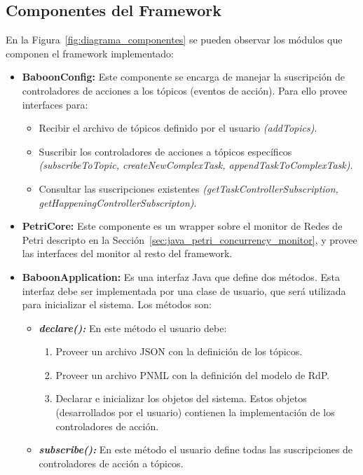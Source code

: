\subsection{Componentes del Framework}
En la Figura~\ref{fig:diagrama_componentes} se pueden observar los
módulos que componen el framework implementado:
\begin{itemize}
  \item \textbf{BaboonConfig: } Este componente se encarga de manejar la
  suscripción de controladores de acciones a los tópicos (eventos de acción).
  Para ello provee interfaces para:
	  \begin{itemize}
	    \item Recibir el archivo de tópicos definido por el usuario
	    \emph{(addTopics)}.
	    \item Suscribir los controladores de acciones a tópicos específicos
	    \emph{(subscribeToTopic, createNewComplexTask, appendTaskToComplexTask)}.
	    \item Consultar las suscripciones existentes
	    \emph{(getTaskControllerSubscription,
	    getHappeningControllerSubscripton)}.
	  \end{itemize}
	  
  \item \textbf{PetriCore: } Este componente es un wrapper sobre el monitor de
  Redes de Petri descripto en la
  Sección~\ref{sec:java_petri_concurrency_monitor}, y provee las interfaces del
  monitor al resto del framework.
  
  \item \textbf{BaboonApplication: } Es una interfaz Java que define dos
  métodos. Esta interfaz debe ser implementada por una clase de usuario, que
  será utilizada para inicializar el sistema. Los métodos son:
  \begin{itemize}
    \item \textbf{\emph{declare(): }} En este método el usuario debe:
    	\begin{enumerate}
    	  \item Proveer un archivo JSON con la definición de los tópicos.
    	  \item Proveer un archivo PNML con la definición del modelo de RdP.
    	  \item Declarar e inicializar los objetos del sistema. Estos objetos
    	  (desarrollados por el usuario) contienen la implementación
    	  de los controladores de acción.
    	\end{enumerate}
    \item \textbf{\emph{subscribe(): }} En este método el usuario define todas
    las suscripciones de controladores de acción a tópicos.
   \end{itemize}
   

\end{itemize}
